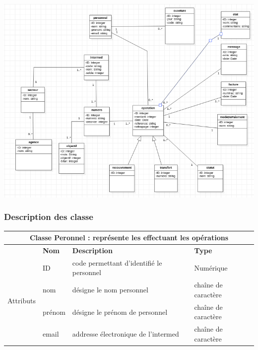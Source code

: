 		\begin{center}
			\includegraphics[width=16cm]{images/diagramme.png}
		\end{center}
	
	\subsubsection{Description des classe}
	
		\begin{tabular}{|l|l|l|l|}
			\hline
			\multicolumn{4}{|c|}{\textbf{Classe Peronnel : représente les effectuant les opérations}}\\
			\hline
			
			 & \textbf{Nom} & \textbf{Description} & \textbf{Type} \\
			\multirow{4}{*}{Attributs} & ID & code permettant d'identifié le personnel & Numérique \\
			& nom & désigne le nom personnel & chaîne de caractère \\
			& prénom & désigne le prénom de personnel & chaîne de caractère \\
			& email & addresse électronique de l'intermed & chaîne de caractère\\
			\hline
		\end{tabular}
		\label{table1}
		
